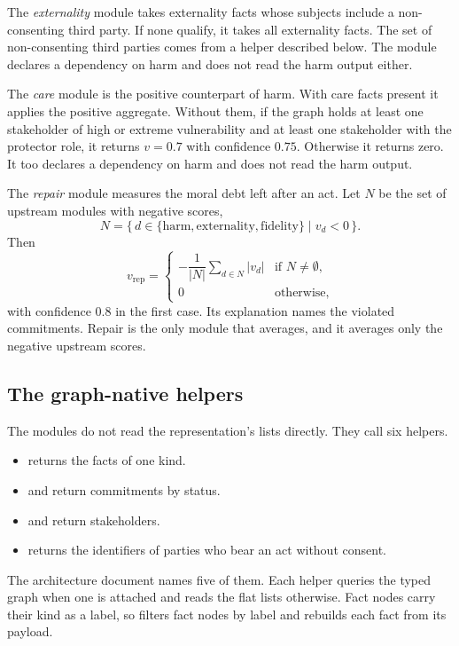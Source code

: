 The \emph{externality} module takes externality facts whose subjects include a non-consenting
third party. If none qualify, it takes all externality facts. The set of non-consenting third
parties comes from a helper described below. The module declares a dependency on harm and does not
read the harm output either.

The \emph{care} module is the positive counterpart of harm. With care facts present it applies
the positive aggregate. Without them, if the graph holds at least one stakeholder of high or
extreme vulnerability and at least one stakeholder with the protector role, it returns
$v = 0.7$ with confidence $0.75$. Otherwise it returns zero. It too declares a dependency on harm
and does not read the harm output.

The \emph{repair} module measures the moral debt left after an act. Let $N$ be the set of upstream
modules with negative scores,
\[
  N = \{\, d \in \{\mathrm{harm}, \mathrm{externality}, \mathrm{fidelity}\} \mid v_d < 0 \,\}.
\]
Then
\begin{equation}
v_{\mathrm{rep}} =
\begin{cases}
-\dfrac{1}{|N|}\displaystyle\sum_{d \in N} |v_d| & \text{if } N \neq \emptyset,\\[2ex]
0 & \text{otherwise,}
\end{cases}
\label{eq:compiler-repair}
\end{equation}
with confidence $0.8$ in the first case. Its explanation names the violated commitments. Repair is
the only module that averages, and it averages only the negative upstream scores.

\subsection{The graph-native helpers}

The modules do not read the representation's lists directly. They call six helpers.
\begin{itemize}
\item {} returns the facts of one kind.
\item {} and  return commitments by status.
\item {} and  return stakeholders.
\item {} returns the identifiers of parties who bear an act
without consent.
\end{itemize}
The architecture document names five of them. Each helper queries the typed graph when one is attached and reads
the flat lists otherwise. Fact nodes carry their kind as a label, so  filters
fact nodes by label and rebuilds each fact from its payload.

